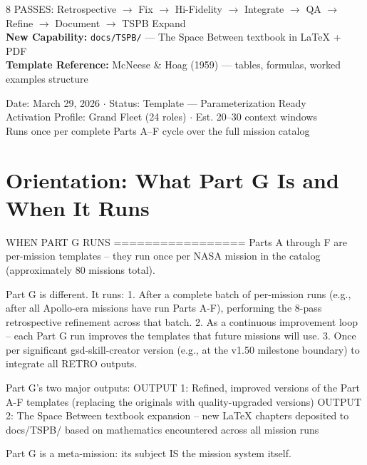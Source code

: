 \documentclass[11pt,letterpaper]{article}
\begin{document}
\begin{center}
\vspace{1cm}
\colorbox{lightprimary}{\parbox{14cm}{\centering\small\sffamily\textcolor{primary}{%
8 PASSES: Retrospective $\to$ Fix $\to$ Hi-Fidelity $\to$ Integrate $\to$ QA $\to$ Refine $\to$ Document $\to$ TSPB Expand\\[0.2em]
\textbf{New Capability:} \texttt{docs/TSPB/} --- The Space Between textbook in LaTeX + PDF\\[0.2em]
\textbf{Template Reference:} McNeese \& Hoag (1959) --- tables, formulas, worked examples structure
}}}

\vspace{1cm}
{\small\sffamily\textcolor{subtlegray}{Date: March 29, 2026 $\cdot$ Status: Template --- Parameterization Ready}}\\[0.2em]
{\small\sffamily\textcolor{subtlegray}{Activation Profile: Grand Fleet (24 roles) $\cdot$ Est. 20--30 context windows}}\\[0.2em]
{\small\sffamily\textcolor{subtlegray}{Runs once per complete Parts A--F cycle over the full mission catalog}}
\end{center}
\newpage

\thispagestyle{fancy}
\section*{Orientation: What Part G Is and When It Runs}

\begin{asciibox}
WHEN PART G RUNS
=================
Parts A through F are per-mission templates -- they run once per
NASA mission in the catalog (approximately 80 missions total).

Part G is different. It runs:
  1. After a complete batch of per-mission runs (e.g., after all
     Apollo-era missions have run Parts A-F), performing the 8-pass
     retrospective refinement across that batch.
  2. As a continuous improvement loop -- each Part G run improves
     the templates that future missions will use.
  3. Once per significant gsd-skill-creator version (e.g., at the
     v1.50 milestone boundary) to integrate all RETRO outputs.

Part G's two major outputs:
  OUTPUT 1: Refined, improved versions of the Part A-F templates
            (replacing the originals with quality-upgraded versions)
  OUTPUT 2: The Space Between textbook expansion -- new LaTeX chapters
            deposited to docs/TSPB/ based on mathematics encountered
            across all mission runs

Part G is a meta-mission: its subject IS the mission system itself.
\end{asciibox}
\end{document}
